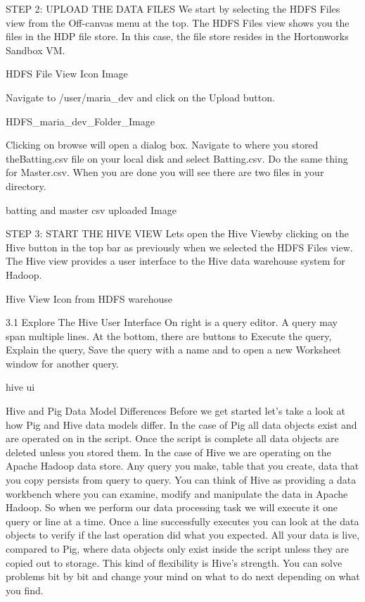 STEP 2: UPLOAD THE DATA FILES
We start by selecting the HDFS Files view from the Off-canvas menu at the top. The HDFS Files view shows you the files in the HDP file
store. In this case, the file store resides in the Hortonworks Sandbox VM.

HDFS File View Icon Image

Navigate to /user/maria_dev and click on the Upload button.

HDFS_maria_dev_Folder_Image

Clicking on browse will open a dialog box. Navigate to where you stored theBatting.csv file on your local disk and select Batting.csv.
Do the same thing for Master.csv. When you are done you will see there are two files in your directory.

batting and master csv uploaded Image

STEP 3: START THE HIVE VIEW
Lets open the Hive Viewby clicking on the Hive button in the top bar as previously when we selected the HDFS Files view. The Hive view provides a user interface to the Hive data warehouse system for Hadoop.

Hive View Icon from HDFS warehouse

3.1 Explore The Hive User Interface
On right is a query editor. A query may span multiple lines. At the bottom, there are buttons to Execute the query, Explain the query, Save the query with a name and to open a new Worksheet window for another query.

hive ui

Hive and Pig Data Model Differences
Before we get started let’s take a look at how Pig and Hive data models differ. In the case of Pig all data objects exist and are operated on in the script. Once the script is complete all data objects are deleted unless you stored them. In the case of Hive we are operating on the Apache Hadoop data store. Any query you make, table that you create, data that you copy persists from query to query. You can think of Hive as providing a data workbench where you can examine, modify and manipulate the data in Apache Hadoop. So when we perform our data processing task we will execute it one query or line at a time. Once a line successfully executes you can look at the data objects to verify if the last operation did what you expected. All your data is live, compared to Pig, where data objects only exist inside the script unless they are copied out to storage. This kind of flexibility is Hive’s strength. You can solve problems bit by bit and change your mind on what to do next depending on what you find.

